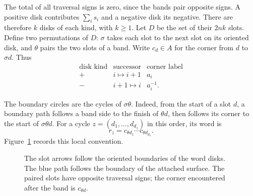 The total of all traversal signs is zero, since the bands pair opposite
signs. A positive disk contributes $\sum_i s_i$ and a negative disk its
negative. There are therefore $k$ disks of each kind, with $k\geq1$.
Let $D$ be the set of their $2nk$ slots. Define two permutations of $D$:
$\sigma$ takes each slot to the next slot on its oriented disk, and
$\theta$ pairs the two slots of a band. Write $c_d\in A$ for the corner
from $d$ to $\sigma d$. Thus
\begin{equation}\label{eq:corners}
 \begin{array}{c|c|c}
 \text{disk kind}&\text{successor}&\text{corner label}\\ \hline
 +&i\longmapsto i+1&a_i\\
 -&i+1\longmapsto i&a_i^{-1}.
 \end{array}
\end{equation}

The boundary circles are the cycles of $\sigma\theta$. Indeed, from the
start of a slot $d$, a boundary path follows a band side to the finish of
$\theta d$, then follows its corner to the start of $\sigma\theta d$.
For a cycle $z=(d_1,\ldots,d_{d_z})$ in this order, its word is
\begin{equation}\label{eq:boundaryword}
 r_z=c_{\theta d_1}\cdots c_{\theta d_{d_z}}.
\end{equation}
Figure~\ref{fig:boundary} records this local convention.

\begin{figure}[ht]
\centering
{}
\caption{The slot arrows follow the oriented boundaries of the word disks.
The blue path follows the boundary of the attached surface. The paired
slots have opposite traversal signs; the corner encountered after the band
is $c_{\theta d}$.}
\label{fig:boundary}
\end{figure}

